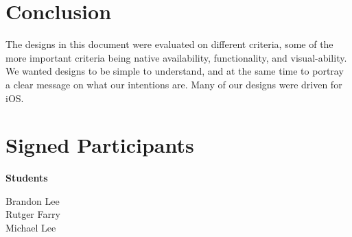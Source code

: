 \documentclass[letterpaper,10pt,titlepage]{article}
\begin{document}
\section{Conclusion}
The designs in this document were evaluated on different criteria, some of the more important criteria being native availability, functionality, and visual-ability. We wanted designs to be simple to understand, and at the same time to portray a clear message on what our intentions are. Many of our designs were driven  for iOS.\\


\newpage

\section{Signed Participants}

\textbf{Students}

Brandon Lee\\
Rutger Farry\\
Michael Lee\\
\end{document}
